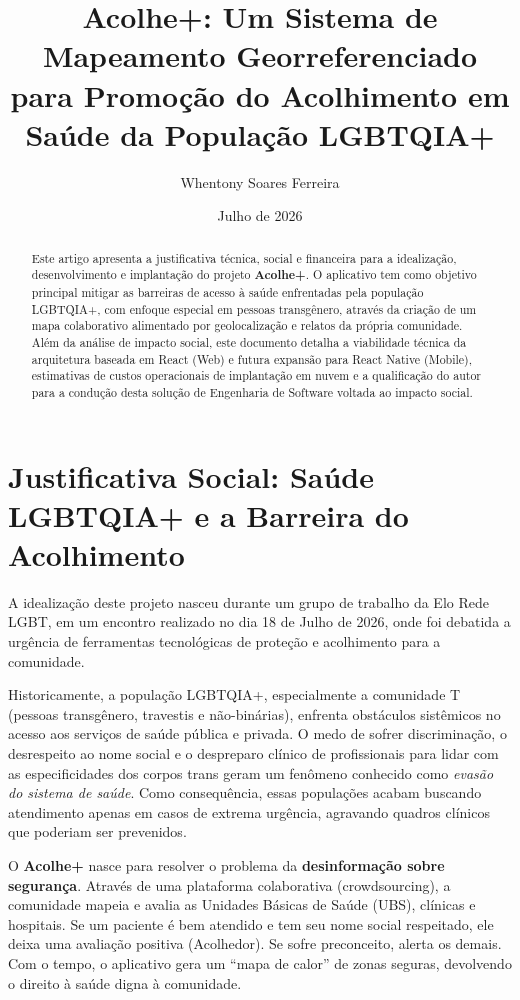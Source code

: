 \documentclass[12pt, a4paper]{article}
\title{\textbf{Acolhe+: Um Sistema de Mapeamento Georreferenciado para Promoção do Acolhimento em Saúde da População LGBTQIA+}}
\author{Whentony Soares Ferreira}
\date{Julho de 2026}
\begin{document}
\maketitle

\begin{abstract}
Este artigo apresenta a justificativa técnica, social e financeira para a idealização, desenvolvimento e implantação do projeto \textbf{Acolhe+}. O aplicativo tem como objetivo principal mitigar as barreiras de acesso à saúde enfrentadas pela população LGBTQIA+, com enfoque especial em pessoas transgênero, através da criação de um mapa colaborativo alimentado por geolocalização e relatos da própria comunidade. Além da análise de impacto social, este documento detalha a viabilidade técnica da arquitetura baseada em React (Web) e futura expansão para React Native (Mobile), estimativas de custos operacionais de implantação em nuvem e a qualificação do autor para a condução desta solução de Engenharia de Software voltada ao impacto social.
\end{abstract}

\section{Justificativa Social: Saúde LGBTQIA+ e a Barreira do Acolhimento}

A idealização deste projeto nasceu durante um grupo de trabalho da Elo Rede LGBT, em um encontro realizado no dia 18 de Julho de 2026, onde foi debatida a urgência de ferramentas tecnológicas de proteção e acolhimento para a comunidade.

Historicamente, a população LGBTQIA+, especialmente a comunidade T (pessoas transgênero, travestis e não-binárias), enfrenta obstáculos sistêmicos no acesso aos serviços de saúde pública e privada. O medo de sofrer discriminação, o desrespeito ao nome social e o despreparo clínico de profissionais para lidar com as especificidades dos corpos trans geram um fenômeno conhecido como \textit{evasão do sistema de saúde}. Como consequência, essas populações acabam buscando atendimento apenas em casos de extrema urgência, agravando quadros clínicos que poderiam ser prevenidos.

O \textbf{Acolhe+} nasce para resolver o problema da \textbf{desinformação sobre segurança}. Através de uma plataforma colaborativa (crowdsourcing), a comunidade mapeia e avalia as Unidades Básicas de Saúde (UBS), clínicas e hospitais. Se um paciente é bem atendido e tem seu nome social respeitado, ele deixa uma avaliação positiva (Acolhedor). Se sofre preconceito, alerta os demais. Com o tempo, o aplicativo gera um ``mapa de calor'' de zonas seguras, devolvendo o direito à saúde digna à comunidade.
\end{document}
